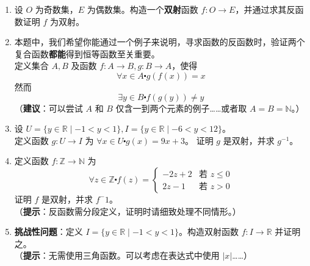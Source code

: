 \begin{enumerate}[label=(\arabic*)]
    \item 设 $O$ 为奇数集，$E$ 为偶数集。构造一个\textbf{双射}函数 $f : O \to E$，并通过求其反函数证明 $f$ 为双射。
    \item 本题中，我们希望你能通过一个例子来说明，寻求函数的反函数时，验证两个复合函数\textbf{都能}得到恒等函数至关重要。\\
    定义集合 $A, B$ 及函数 $f : A \to B, g : B \to A$，使得
    \[\forall x \in A \centerdot g(f(x)) = x\]
    然而
    \[\exists y \in B \centerdot f(g(y)) \ne y\]
    （\textbf{建议}：可以尝试 $A$ 和 $B$ 仅含一到两个元素的例子……或者取 $A=B=\mathbb{N}$。）\label{exc:exercises7.5.2}
    \item 设 $U = \{y \in \mathbb{R} \mid -1 < y < 1\}, I = \{y \in \mathbb{R} \mid -6 < y < 12\}$。\\
        定义函数 $g : U \to I$ 为 $\forall x \in U \centerdot g(x) = 9x + 3$。
        证明 $g$ 是双射，并求 $g^{-1}$。
    \item 定义函数 $f : \mathbb{Z} \to \mathbb{N}$ 为
    \[\forall z \in \mathbb{Z} \centerdot f(z) = \begin{cases}
        -2z + 2 & \text{若\ } z \le 0 \\
        2z-1 & \text{若\ } z > 0
    \end{cases}\]
    证明 $f$ 是双射，并求 $f^-1$。\\
    （\textbf{提示}：反函数需分段定义，证明时请细致处理不同情形。）
    \item \textbf{挑战性问题}：定义 $I = \{y \in \mathbb{R} \mid -1 < y < 1\}$。构造双射函数 $f : I \to \mathbb{R}$ 并证明之。\\
    （\textbf{提示}：无需使用三角函数。可以考虑在表达式中使用 $|x|$……）\label{exc:exercises7.5.5}
\end{enumerate}